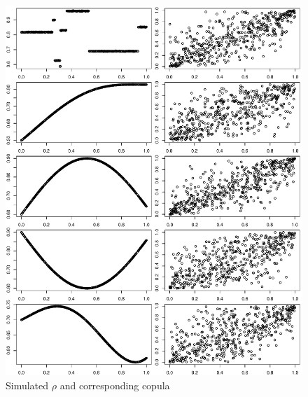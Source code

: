 \documentclass{amsart}
\begin{document}
\begin{figure}
    \centering
    \includegraphics[width=0.95\linewidth]{true_rho_copula.pdf}
    \caption{Simulated $\rho$ and corresponding copula}
    \label{fig:sim-dat}
\end{figure}
\end{document}
